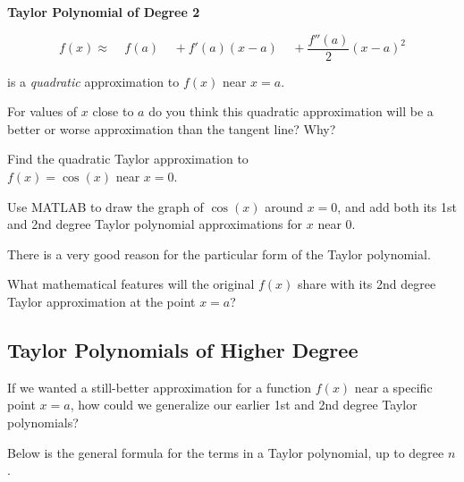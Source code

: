 \vfill

\newpage

\begin{boxnote}

{\bf Taylor Polynomial of Degree 2}
\vspace{1in}

$$ f(x) \approx ~~~~~f(a) ~~~~~+ f'(a) (x-a) ~~~~~+ \frac{f''(a)}{2} (x-a)^2$$  

\vspace{1in}

is a {\em quadratic} approximation to $f(x)$ near $x=a$.
\end{boxnote}


\problem For values of $x$ close to $a$ do you think this quadratic
approximation will be a better or worse approximation than the tangent
line?  Why?

\vfill

\newpage
{}

\problem Find the quadratic Taylor approximation to \\$f(x) = \cos(x)$
  near $x=0$.

\vfill

\newpage

\problem Use MATLAB to draw the graph of $\cos(x)$ around $x=0$, and
add both its 1st and 2nd degree Taylor polynomial approximations for
$x$ near 0.


\newpage

There is a very good reason for the particular form of the Taylor
polynomial.

\problem What mathematical features will the original $f(x)$ share
with its 2nd degree Taylor approximation at the point $x=a$?

\vfill

\newpage
{}
\subsection{Taylor Polynomials of Higher Degree}

\problem If we wanted a still-better approximation for a function
$f(x)$ near a specific point $x=a$, how could we generalize our
earlier 1st and 2nd degree Taylor polynomials?

\vfill

\newpage 

Below is the general formula for the terms in a Taylor polynomial, up
to degree $n$.  \\

